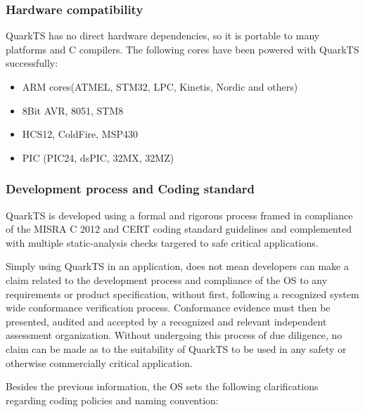 \subsubsection{Hardware compatibility}
QuarkTS has no direct hardware dependencies, so it is portable to many platforms and C compilers. 
The following cores have been powered with QuarkTS successfully:
\begin{itemize}
    \item ARM cores(ATMEL, STM32, LPC, Kinetis, Nordic and others)
    \item 8Bit AVR, 8051, STM8
    \item HCS12, ColdFire, MSP430
    \item PIC (PIC24, dsPIC, 32MX, 32MZ)
\end{itemize}

\subsubsection{Development process and Coding standard}

QuarkTS is developed using a formal and rigorous process framed in compliance of the MISRA C 2012 and CERT coding standard guidelines and complemented with multiple static-analysis checks targered to safe critical applications.  

Simply using QuarkTS in an application, does not mean developers can make a claim related to the development process and compliance of the OS to any requirements or product specification, without first, following a recognized system wide conformance verification process. Conformance evidence must then be presented, audited and accepted by a recognized and relevant independent assessment organization. 
Without undergoing this process of due diligence, no claim can be made as to the suitability of QuarkTS to be used in any safety or otherwise commercially critical application.

Besides the previous information, the OS sets the following clarifications regarding coding policies and naming convention:

